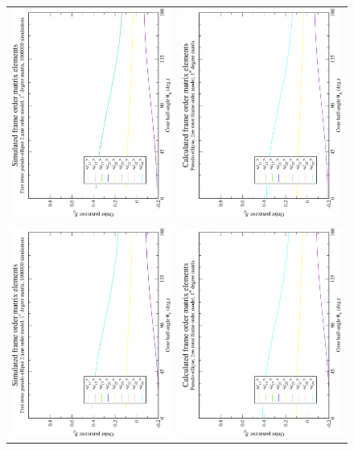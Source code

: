\begin{figure}
\centering
  \begin{tabular}{@{}cc@{}}
    \includegraphics[width=.35\textwidth,angle=270]{images/frame_order_matrix/Sij_pseudo-ellipse_free_rotor_out_of_frame_theta_x_ens1000000.eps} &
    \includegraphics[width=.35\textwidth,angle=270]{images/frame_order_matrix/Sij_pseudo-ellipse_free_rotor_out_of_frame_theta_x_calc.eps} \\
    \\[-5pt]
    \includegraphics[width=.35\textwidth,angle=270]{images/frame_order_matrix/Sij_pseudo-ellipse_free_rotor_out_of_frame_theta_y_ens1000000.eps} &
    \includegraphics[width=.35\textwidth,angle=270]{images/frame_order_matrix/Sij_pseudo-ellipse_free_rotor_out_of_frame_theta_y_calc.eps} \\

\end{tabular}
\end{figure}
